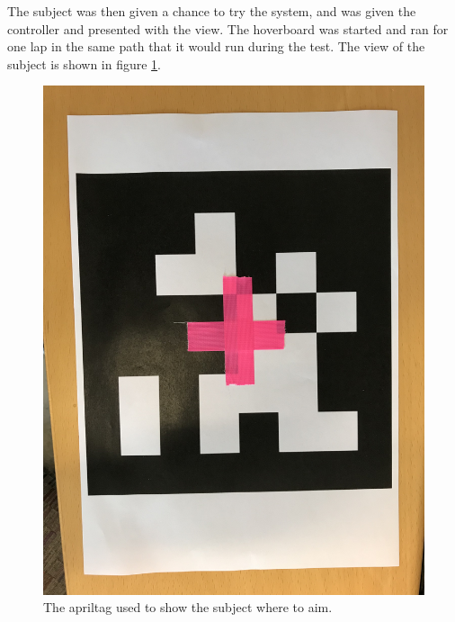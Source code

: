 \documentclass[nofilelist]{cslthse-msc}
\begin{document}
The subject was then given a chance to try the system, and was given the controller and presented with the view. The hoverboard was started and ran for one lap in the same path that it would run during the test. The view of the subject is shown in figure \ref{fig:}.

\begin{figure}[!hbt]
   \centering
   \includegraphics[scale=0.08]{images/apriltag.jpg} 
   \caption{The apriltag used to show the subject where to aim.}
   \label{fig:}
\end{figure}
\end{document}

